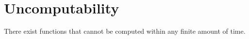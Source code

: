 \section{Uncomputability}

There exist functions that cannot be computed within any finite amount of time.







